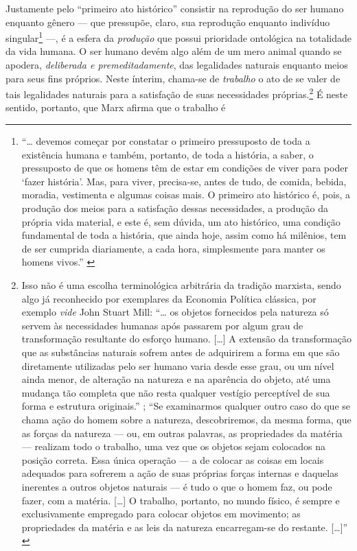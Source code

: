 Justamente pelo ``primeiro ato histórico'' consistir na reprodução do ser humano enquanto gênero --- que pressupõe, claro, sua reprodução enquanto indivíduo singular\footnote{``\ldots{} devemos começar por constatar o primeiro pressuposto de toda a existência humana e também, portanto, de toda a história, a saber, o pressuposto de que os homens têm de estar em condições de viver para poder `fazer história'. Mas, para viver, precisa-se, antes de tudo, de comida, bebida, moradia, vestimenta e algumas coisas mais. O primeiro ato histórico é, pois, a produção dos meios para a satisfação dessas necessidades, a produção da própria vida material, e este é, sem dúvida, um ato histórico, uma condição fundamental de toda a história, que ainda hoje, assim como há milênios, tem de ser cumprida diariamente, a cada hora, simplesmente para manter os homens vivos.'' \parencite[p. 32-3]{Marx2007}} ---, é a esfera da \emph{produção} que possui prioridade ontológica na totalidade da vida humana. O ser humano devém algo além de um mero animal quando se apodera, \emph{deliberada e premeditadamente}, das legalidades naturais enquanto meios para seus fins próprios. Neste ínterim, chama-se de \emph{trabalho} o ato de se valer de tais legalidades naturais para a satisfação de suas necessidades próprias.\footnote{Isso não é uma escolha terminológica arbitrária da tradição marxista, sendo algo já reconhecido por exemplares da Economia Política clássica, por exemplo \emph{vide} John Stuart Mill: ``\ldots{} os objetos fornecidos pela natureza só servem às necessidades humanas após passarem por algum grau de transformação resultante do esforço humano. {[}\ldots{]} A extensão da transformação que as substâncias naturais sofrem antes de adquirirem a forma em que são diretamente utilizadas pelo ser humano varia desde esse grau, ou um nível ainda menor, de alteração na natureza e na aparência do objeto, até uma mudança tão completa que não resta qualquer vestígio perceptível de sua forma e estrutura originais.'' \parencite[p. 46]{Mill1909}; ``Se examinarmos qualquer outro caso do que se chama ação do homem sobre a natureza, descobriremos, da mesma forma, que as forças da natureza --- ou, em outras palavras, as propriedades da matéria --- realizam todo o trabalho, uma vez que os objetos sejam colocados na posição correta. Essa única operação --- a de colocar as coisas em locais adequados para sofrerem a ação de suas próprias forças internas e daquelas inerentes a outros objetos naturais --- é tudo o que o homem faz, ou pode fazer, com a matéria. {[}\ldots{]} O trabalho, portanto, no mundo físico, é sempre e exclusivamente empregado para colocar objetos em movimento; as propriedades da matéria e as leis da natureza encarregam-se do restante. {[}\ldots{]}'' \parencite[p. 48]{Mill1909}} É neste sentido, portanto, que Marx afirma que o trabalho é

